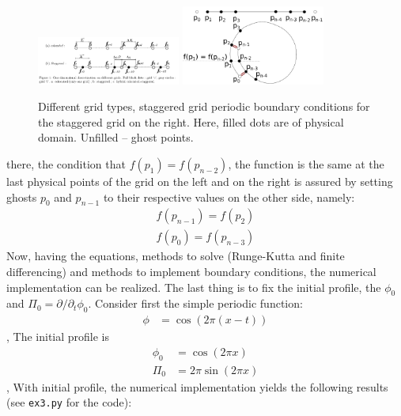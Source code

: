 \documentclass{article}
\begin{document}
\begin{figure}[t]
	\label{fig:grids}
	\centering 
	\includegraphics[width=0.42\textwidth]{./fig3/grids.pdf}
	\includegraphics[width=0.42\textwidth]{./fig3/cartoon.pdf}
	\caption{Different grid types, staggered grid periodic boundary conditions for the staggered grid on the right. Here, filled dots are of physical domain. Unfilled -- ghost points.}
\end{figure}
there, the condition that $f(p_{1}) = f(p_{n-2})$, the function is the same at the last physical points of the grid on the left and on the right is assured by setting ghosts $p_0$ and $p_{n-1}$ to their respective values on the other side, namely: 
\begin{equation}
\begin{aligned}
f(p_{n-1}) = f(p_2) \\
f(p_{0}) = f(p_{n-3})
\end{aligned}
\end{equation}
Now, having the equations, methods to solve (Runge-Kutta and finite differencing) and methods to implement boundary conditions, the numerical implementation can be realized. The last thing is to fix the initial profile, the $\phi_0$ and $\Pi_0 = \partial/\partial_t\phi_0$. Consider first the simple periodic function:
\begin{equation}
\begin{aligned}
\phi &= \cos(2 \pi (x-t))
\end{aligned}
\end{equation}, 
The initial profile is
\begin{equation}
\begin{aligned}
\phi_0 &= \cos(2 \pi x) \\
\Pi_0 &= 2\pi\sin(2 \pi x)
\end{aligned}
\end{equation},
With initial profile, the numerical implementation yields the following results (see \texttt{ex3.py} for the code): 
\end{document}
